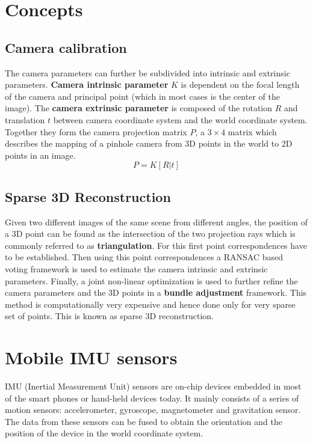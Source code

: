 \documentclass{article}
\begin{document}
	\section{Concepts} 
		

			\subsection{Camera calibration}
				The camera parameters can further be subdivided into intrinsic and extrinsic parameters. \textbf{Camera intrinsic parameter} $K$ is dependent on the focal length of the camera and principal point (which in most cases is the center of the image). The \textbf{camera extrinsic parameter} is composed of the rotation $R$ and translation $t$ between camera coordinate system and the world coordinate system. Together they form the camera projection matrix $P$, a $3 \times 4$ matrix which describes the mapping of a pinhole camera from 3D points in the world to 2D points in an image.
				\begin{equation}
				P = K[R|t]
				\end{equation}
			
			\subsection{Sparse 3D Reconstruction} 
				Given two different images of the same scene from different angles, the position of a 3D point can be found as the intersection of the two projection rays which is commonly referred to as \textbf{triangulation}. For this first point correspondences have to be established. Then using this point correspondences a RANSAC based voting framework is used to estimate the camera intrinsic and extrinsic parameters. Finally, a joint non-linear optimization is used to further refine the camera parameters and the 3D points in a \textbf{bundle adjustment} framework. This method is computationally very expensive and hence done only for very sparse set of points. This is known as sparse 3D reconstruction.

			\section{Mobile IMU sensors}
				IMU (Inertial Measurement Unit) sensors are on-chip devices embedded in most of the smart phones or hand-held devices today. It mainly consists of a series of motion sensors: accelerometer, gyroscope, magnetometer and gravitation sensor. The data from these sensors can be fused to obtain the orientation and the position of the device in the world coordinate system.
\end{document}
